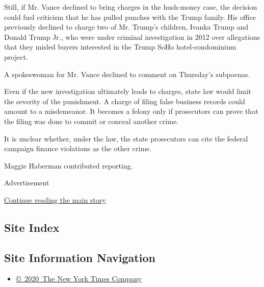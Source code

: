 Still, if Mr. Vance declined to bring charges in the hush-money case,
the decision could fuel criticism that he has pulled punches with the
Trump family. His office previously declined to charge two of Mr.
Trump's children, Ivanka Trump and Donald Trump Jr., who were under
criminal investigation in 2012 over allegations that they misled buyers
interested in the Trump SoHo hotel-condominium project.

A spokeswoman for Mr. Vance declined to comment on Thursday's subpoenas.

Even if the new investigation ultimately leads to charges, state law
would limit the severity of the punishment. A charge of filing false
business records could amount to a misdemeanor. It becomes a felony only
if prosecutors can prove that the filing was done to commit or conceal
another crime.

It is unclear whether, under the law, the state prosecutors can cite the
federal campaign finance violations as the other crime.

Maggie Haberman contributed reporting.

Advertisement

\protect\hyperlink{after-bottom}{Continue reading the main story}

\hypertarget{site-index}{%
\subsection{Site Index}\label{site-index}}

\hypertarget{site-information-navigation}{%
\subsection{Site Information
Navigation}\label{site-information-navigation}}

\begin{itemize}
\tightlist
\item
  \href{https://help.nytimes.com/hc/en-us/articles/115014792127-Copyright-notice}{©~2020~The
  New York Times Company}
\end{itemize}

